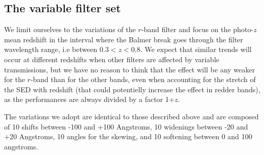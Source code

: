 \documentclass[11pt]{article}
\begin{document}
    \subsection{The variable filter set}\label{the-variable-filter-set}

We limit ourselves to the variations of the \(r\)-band filter and focus
on the photo-\(z\) mean redshift in the interval where the Balmer break
goes through the filter wavelength range, i.e between \(0.3<z<0.8\). We
expect that similar trends will occur at different redshifts when other
filters are affected by variable transmissions, but we have no reason to
think that the effect will be any weaker for the \(r\)-band than for the
other bands, even when accounting for the stretch of the SED with
redshift (that could potentielly increase the effect in redder bands),
as the performances are always divided by a factor 1+\(z\).

The variations we adopt are identical to those described above and are
composed of 10 shifts between -100 and +100 Angstroms, 10 widenings
between -20 and +20 Angstroms, 10 angles for the skewing, and 10
softening between 0 and 100 angstroms.
\end{document}
